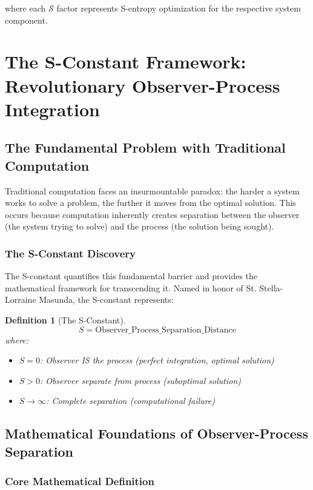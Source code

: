 \documentclass[12pt,a4paper]{article}
\newtheorem{definition}[theorem]{Definition}
\begin{document}
{where each $\mathcal{S}$ factor represents S-entropy optimization for the respective system component.

\section{The S-Constant Framework: Revolutionary Observer-Process Integration}

\subsection{The Fundamental Problem with Traditional Computation}

Traditional computation faces an insurmountable paradox: the harder a system works to solve a problem, the further it moves from the optimal solution. This occurs because computation inherently creates separation between the observer (the system trying to solve) and the process (the solution being sought).

\subsubsection{The S-Constant Discovery}

The S-constant quantifies this fundamental barrier and provides the mathematical framework for transcending it. Named in honor of St. Stella-Lorraine Masunda, the S-constant represents:

\begin{definition}[The S-Constant]
$$S = \text{Observer\_Process\_Separation\_Distance}$$
where:
\begin{itemize}
\item $S = 0$: Observer IS the process (perfect integration, optimal solution)
\item $S > 0$: Observer separate from process (suboptimal solution)
\item $S \to \infty$: Complete separation (computational failure)
\end{itemize}
\end{definition}

\subsection{Mathematical Foundations of Observer-Process Separation}

\subsubsection{Core Mathematical Definition}

}
\end{document}
